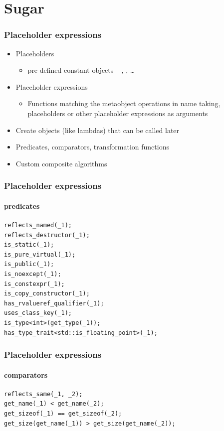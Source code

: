 \documentclass[compress,table,xcolor=table]{beamer}
\begin{document}
\section{Sugar}
\begin{frame}
  \frametitle{Placeholder expressions}
  \larger
  \begin{itemize}
    \item Placeholders
    \begin{itemize}
      \item pre-defined constant objects -- , , \ldots
    \end{itemize}
    \item Placeholder expressions
    \begin{itemize}
      \item Functions matching the metaobject operations in name taking,
        placeholders or other placeholder expressions as arguments
    \end{itemize}
    \item Create objects (like lambdas) that can be called later
    \item Predicates, comparators, transformation functions
    \item Custom composite algorithms
  \end{itemize}
\end{frame}
\begin{frame}[fragile]
  \frametitle{Placeholder expressions}
  \framesubtitle{predicates}
  \begin{lstlisting}[language=c++2x,basicstyle=\small\ttfamily]
reflects_named(_1);
reflects_destructor(_1);
is_static(_1);
is_pure_virtual(_1);
is_public(_1);
is_noexcept(_1);
is_constexpr(_1);
is_copy_constructor(_1);
has_rvalueref_qualifier(_1);
uses_class_key(_1);
is_type<int>(get_type(_1));
has_type_trait<std::is_floating_point>(_1);
  \end{lstlisting}
\end{frame}
\begin{frame}[fragile]
  \frametitle{Placeholder expressions}
  \framesubtitle{comparators}
  \begin{lstlisting}[language=c++2x,basicstyle=\small\ttfamily]
reflects_same(_1, _2);
get_name(_1) < get_name(_2);
get_sizeof(_1) == get_sizeof(_2);
get_size(get_name(_1)) > get_size(get_name(_2));
  \end{lstlisting}
\end{frame}
\end{document}
